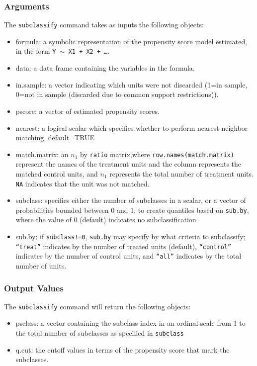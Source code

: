\documentclass[oneside,letterpaper,titlepage]{article}
\begin{document}
\begin{appendix}
\subsubsection{Arguments}
The \texttt{subclassify} command takes as inputs the following
objects:
\begin{itemize}
\item{formula}:  a symbolic representation of the propensity score model estimated, in the form {\tt Y $\sim$ X1 + X2 + \dots}.
\item{data}: a data frame containing the variables in the formula.
\item{in.sample}:  a vector indicating which units were not discarded (1=in sample, 0=not in sample (discarded due to common support restrictions)).
\item{pscore}: a vector of estimated propensity scores.  
\item{nearest}: a logical scalar which specifies whether
  to perform nearest-neighbor matching, default=TRUE 
\item{match.matrix}: an $n_1$ by \texttt{ratio} matrix,where
  \texttt{row.names(match.matrix)} represent the names of the
  treatment units and the column represents the matched control units, and $n_1$
  represents the total number of treatment units.  \texttt{NA}
  indicates that the unit was not matched. 
\item{subclass}: specifies either the number of
  subclasses in a scalar, or a vector of probabilities bounded
  between 0 and 1, to create quantiles based on \texttt{sub.by}, where the value of
  0 (default) indicates no subclassification
\item{sub.by}: if \texttt{subclass!=0}, \texttt{sub.by} may specify
  by what criteria to subclassify;
  {\tt ``treat''} indicates by the number of treated units (default), {\tt ``control''} indicates by
  the number of control units, and {\tt ``all''} indicates by the total
  number of units.  
\end{itemize}

\subsubsection{Output Values}
The \texttt{subclassify} command will return the following objects: 
\begin{itemize}
\item{psclass}: a vector containing the subclass index in an ordinal scale
  from 1 to the total number of subclasses as specified in
  \texttt{subclass} 
\item{q.cut}: the cutoff values in terms of the propensity score that
  mark the subclasses.
\end{itemize}


\end{appendix}
\end{document}
